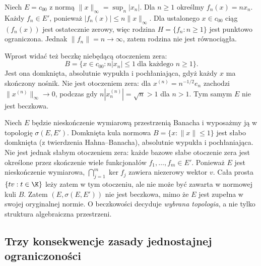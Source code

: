 \begin{przyklad}
\label{ex:c00-not-barrelled}
Niech $E=c_{00}$ z normą $\|x\|_\infty=\sup_n|x_n|$.
Dla $n\ge1$ określmy $f_n(x)=nx_n$. Każdy $f_n\in E'$,
ponieważ $|f_n(x)|\le n\|x\|_\infty$.
Dla ustalonego $x\in c_{00}$ ciąg $(f_n(x))$ jest
ostatecznie zerowy, więc rodzina $H=\{f_n:n\ge1\}$ jest
punktowo ograniczona. Jednak $\|f_n\|=n\to\infty$,
zatem rodzina nie jest równociągła.

Wprost widać też beczkę niebędącą otoczeniem zera:
\[
 B=\{x\in c_{00}: n|x_n|\le1\ \text{dla każdego }n\ge1\}.
\]
Jest ona domknięta, absolutnie wypukła i pochłaniająca,
gdyż każdy $x$ ma skończony nośnik. Nie jest otoczeniem
zera: dla $x^{(n)}=n^{-1/2}e_n$ zachodzi
$\|x^{(n)}\|_\infty\to0$, podczas gdy
$n|x_n^{(n)}|=\sqrt n>1$ dla $n>1$. Tym samym
$E$ nie jest beczkowa.
\end{przyklad}

\begin{przyklad}
\label{ex:weak-not-barrelled}
Niech $E$ będzie nieskończenie wymiarową przestrzenią Banacha
i wyposażmy ją w topologię $\sigma(E,E')$. Domknięta kula
normowa $B=\{x:\|x\|\le1\}$ jest słabo domknięta
(z twierdzenia Hahna--Banacha), absolutnie wypukła i pochłaniająca.
Nie jest jednak słabym otoczeniem zera: każde bazowe słabe
otoczenie zera jest określone przez skończenie wiele funkcjonałów
$f_1,\ldots,f_m\in E'$. Ponieważ $E$ jest nieskończenie wymiarowa,
$\bigcap_{j=1}^m\ker f_j$ zawiera niezerowy wektor $v$.
Cała prosta $\{tv:t\in\K\}$ leży zatem w tym otoczeniu,
ale nie może być zawarta w normowej kuli $B$. Zatem $(E,\sigma(E,E'))$ nie jest beczkowa,
mimo że $E$ jest zupełna w swojej oryginalnej normie.
O beczkowości decyduje \emph{wybrana topologia}, a nie tylko
struktura algebraiczna przestrzeni.
\end{przyklad}

\subsection{Trzy konsekwencje zasady jednostajnej ograniczoności}

